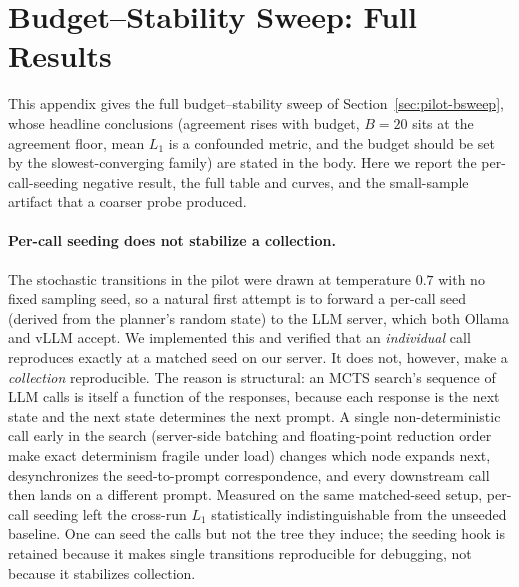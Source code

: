 \section{Budget--Stability Sweep: Full Results}
\label{app:bsweep}

This appendix gives the full budget--stability sweep of
Section~\ref{sec:pilot-bsweep}, whose headline conclusions (agreement
rises with budget, $B = 20$ sits at the agreement floor, mean $L_1$ is a
confounded metric, and the budget should be set by the slowest-converging
family) are stated in the body. Here we report the per-call-seeding
negative result, the full table and curves, and the small-sample
artifact that a coarser probe produced.

\paragraph{Per-call seeding does not stabilize a collection.} The
stochastic transitions in the pilot were drawn at temperature $0.7$ with
no fixed sampling seed, so a natural first attempt is to forward a
per-call seed (derived from the planner's random state) to the LLM
server, which both Ollama and vLLM accept. We implemented this and
verified that an \emph{individual} call reproduces exactly at a matched
seed on our server. It does not, however, make a \emph{collection}
reproducible. The reason is structural: an MCTS search's sequence of LLM
calls is itself a function of the responses, because each response is the
next state and the next state determines the next prompt. A single
non-deterministic call early in the search (server-side batching and
floating-point reduction order make exact determinism fragile under load)
changes which node expands next, desynchronizes the seed-to-prompt
correspondence, and every downstream call then lands on a different
prompt. Measured on the same matched-seed setup, per-call seeding left
the cross-run $L_1$ statistically indistinguishable from the unseeded
baseline. One can seed the calls but not the tree they induce; the
seeding hook is retained because it makes single transitions reproducible
for debugging, not because it stabilizes collection.

